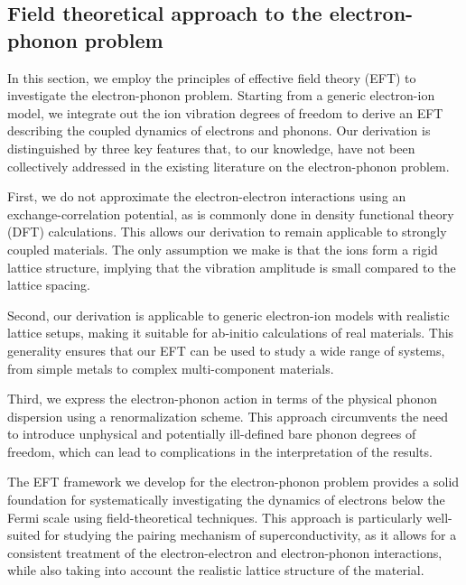 \documentclass[%
 reprint,
superscriptaddress,
 amsmath,amssymb,
 aps,
prx,
]{revtex4-2}
\begin{document}
\appendix
\begin{appendices}


\section{Field theoretical approach to the electron-phonon problem}
\label{sec:app_epi}
In this section, we employ the principles of effective field theory (EFT) to investigate the electron-phonon problem. Starting from a generic electron-ion model, we integrate out the ion vibration degrees of freedom to derive an EFT describing the coupled dynamics of electrons and phonons. Our derivation is distinguished by three key features that, to our knowledge, have not been collectively addressed in the existing literature on the electron-phonon problem.

First, we do not approximate the electron-electron interactions using an exchange-correlation potential, as is commonly done in density functional theory (DFT) calculations\cite{giustino_2017}. This allows our derivation to remain applicable to strongly coupled materials. The only assumption we make is that the ions form a rigid lattice structure, implying that the vibration amplitude is small compared to the lattice spacing.

Second, our derivation is applicable to generic electron-ion models with realistic lattice setups, making it suitable for ab-initio calculations of real materials. This generality ensures that our EFT can be used to study a wide range of systems, from simple metals to complex multi-component materials.

Third, we express the electron-phonon action in terms of the physical phonon dispersion using a renormalization scheme. This approach circumvents the need to introduce unphysical and potentially ill-defined bare phonon degrees of freedom, which can lead to complications in the interpretation of the results.

The EFT framework we develop for the electron-phonon problem provides a solid foundation for systematically investigating the dynamics of electrons below the Fermi scale using field-theoretical techniques. This approach is particularly well-suited for studying the pairing mechanism of superconductivity, as it allows for a consistent treatment of the electron-electron and electron-phonon interactions, while also taking into account the realistic lattice structure of the material.


\end{appendices}
\end{document}
